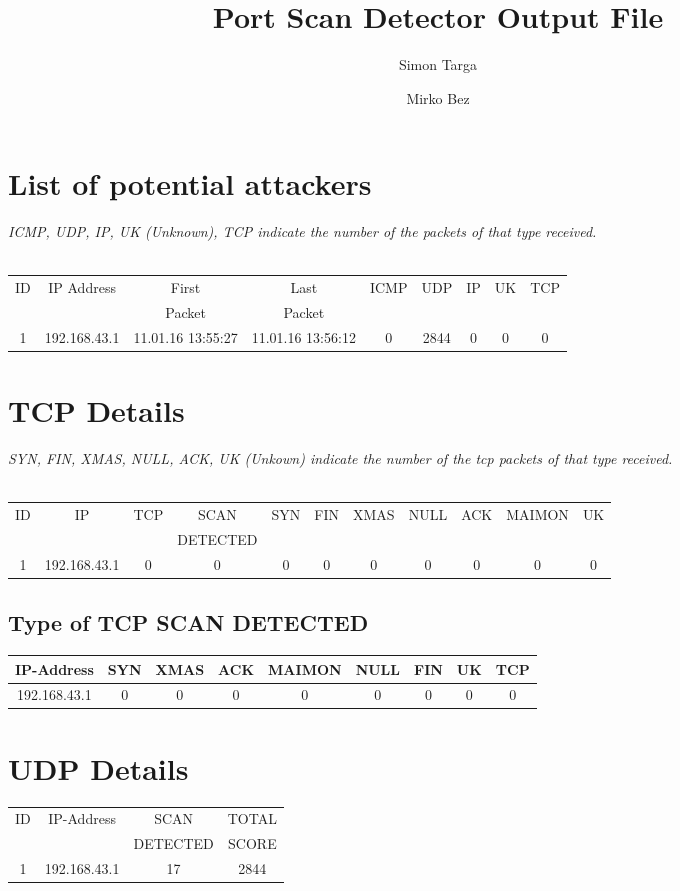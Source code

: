\documentclass[a4paper]{scrartcl}
\author{Simon Targa \and Mirko Bez}
\title{Port Scan Detector Output File}
\begin{document}
\maketitle{}
\tableofcontents
\newpage
\section{List of potential attackers}
\emph{ICMP, UDP, IP, UK (Unknown), TCP indicate the number of the packets of that type received.} \\ \\ 
\begin{tabular}{| c | c | c | c | c | c | c | c | c | }
	\hline
	ID & IP Address & First & Last  & ICMP & UDP & IP & UK & TCP \\ 
   &            & Packet & Packet &     &    &    &     & \\ 
	\hline
	1 & 192.168.43.1 & 11.01.16 13:55:27 & 11.01.16 13:56:12 &   0 & 2844 &   0 &   0 &   0 \\ 
	\hline
\end{tabular}
\section{TCP Details}
\emph{SYN, FIN, XMAS, NULL, ACK, UK (Unkown) indicate the number of the tcp packets of that type received.} \\ \\ 
\begin{tabular}{| c | c | c | c | c | c | c | c | c | c | c | }
\hline 
ID & IP & TCP & SCAN & SYN  & FIN & XMAS & NULL & ACK & MAIMON & UK \\ 
 &  & & DETECTED &   &  &  &  &  & &  \\ 
\hline 
1 & 192.168.43.1 &   0 &   0 &   0 &   0 &   0 &   0 &   0 &   0 &   0\\ 
\hline
\end{tabular}
\subsection{Type of TCP SCAN DETECTED}
\begin{tabular}{| c | c | c | c | c | c | c | c | c | }
\hline 
IP-Address &  SYN & XMAS & ACK & MAIMON & NULL & FIN & UK & TCP \\ 
\hline 
192.168.43.1& 0 & 0 & 0 & 0 & 0 & 0 & 0 & 0  \\ 
 \hline
\end{tabular}
\section{UDP Details}
\begin{tabular}{| c | c | c | c |}
\hline 
ID & IP-Address & SCAN     & TOTAL \\ 
   &            & DETECTED & SCORE \\ 
\hline
1 & 192.168.43.1 & 17 & 2844 \\ \hline 
\end{tabular}
\end{document}
